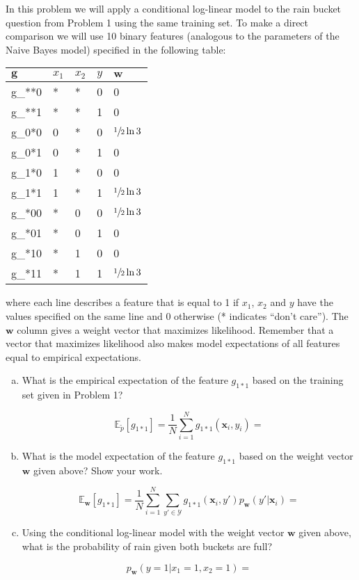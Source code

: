 \documentclass[a4paper,fleqn]{article}
\renewcommand{\vec}{\mathbf}
\begin{document}
In this problem we will apply a conditional log-linear model to the
rain bucket question from Problem 1 using the same training set.  To
make a direct comparison we will use 10 binary features (analogous to
the parameters of the Naive Bayes model) specified in the following
table:

\begin{center}
\begin{tabular}{lllll}
$\vec{g}$ & $x_1$ & $x_2$ & $y$ & $\vec{w}$ \\ \hline
g_{**0} & * & * & 0 & 0\\
g_{**1} & * & * & 1 & 0\\
g_{0*0} & 0 & * & 0 & $\sfrac{1}{2}\ln 3$\\
g_{0*1} & 0 & * & 1 & 0\\
g_{1*0} & 1 & * & 0 & 0\\
g_{1*1} & 1 & * & 1 & $\sfrac{1}{2}\ln 3$\\
g_{*00} & * & 0 & 0 & $\sfrac{1}{2}\ln 3$\\
g_{*01} & * & 0 & 1 & 0\\
g_{*10} & * & 1 & 0 & 0\\
g_{*11} & * & 1 & 1 & $\sfrac{1}{2}\ln 3$\\
\end{tabular}
\end{center}

where each line describes a feature that is equal to 1 if $x_1$, $x_2$
and $y$ have the values specified on the same line and 0 otherwise (*
indicates ``don't care'').  The $\vec{w}$ column gives a weight vector
that maximizes likelihood.  Remember that a vector that maximizes
likelihood also makes model expectations of all features equal to
empirical expectations.

\begin{enumerate}[(a)]
\item What is the empirical expectation of the feature $g_{1*1}$
based on the training set given in Problem 1?

\[\mathbb{E}_{\tilde{p}} [g_{1*1}] = 
\frac{1}{N} \sum_{i=1}^N g_{1*1}(\vec{x}_i, y_i)=
\]
\item What is the model expectation of the feature $g_{1*1}$ based on
  the weight vector $\vec{w}$ given above?  Show your work.

\[\mathbb{E}_{\vec{w}} [g_{1*1}] =
\frac{1}{N} \sum_{i=1}^N \sum_{y'\in\mathcal{Y}}
g_{1*1}(\vec{x}_i, y') p_\vec{w}(y'|\vec{x}_i) =
\]
\vspace*{4cm}

\item Using the conditional log-linear model with the weight vector
  $\vec{w}$ given above, what is the probability of rain given both
  buckets are full?

\[ p_\vec{w}(y=1 | x_1=1, x_2=1)= \]

\end{enumerate}
\end{document}
